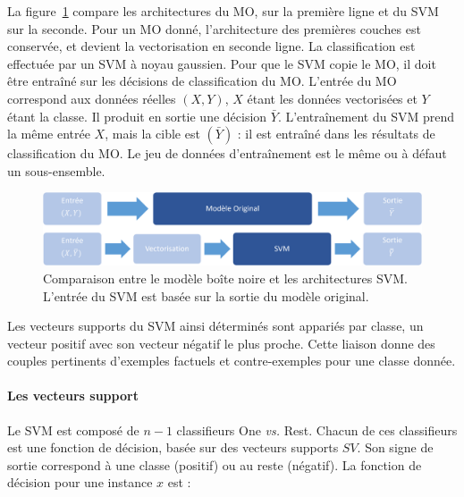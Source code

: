 
La figure~\ref{fig:model_architecture} compare les architectures du MO, sur la première ligne et du SVM sur la seconde. Pour un MO donné, l'architecture des premières couches est conservée, et devient la vectorisation en seconde ligne. La classification est effectuée par un SVM à noyau gaussien. Pour que le SVM copie le MO, il doit être entraîné sur les décisions de classification du MO. L'entrée du MO correspond aux données réelles $(X,Y)$, $X$ étant les données vectorisées et $Y$ étant la classe. Il produit en sortie une décision $\bar{Y}$. L'entraînement du SVM prend la même entrée $X$, mais la cible est $(\bar{Y})$ : il est entraîné dans les résultats de classification du MO. Le jeu de données d'entraînement est le même ou à défaut un sous-ensemble.

\begin{figure}[h!tpb]
\centering \includegraphics[width=\textwidth]{S4-Explicabilite_globale/figures/model_architecture.png}
\caption{Comparaison entre le modèle boîte noire et les architectures SVM. L'entrée du SVM est basée sur la sortie du modèle original.} \label{fig:model_architecture}
\end{figure}

Les vecteurs supports du SVM ainsi déterminés sont appariés par classe, un vecteur positif avec son vecteur négatif le plus proche. Cette liaison donne des couples pertinents d'exemples factuels et contre-exemples pour une classe donnée.

\paragraph{Les vecteurs support}
Le SVM est composé de $n-1$ classifieurs One \textit{vs.} Rest. Chacun de ces classifieurs est une fonction de décision, basée sur des vecteurs supports $SV$. Son signe de sortie correspond à une classe (positif) ou au reste (négatif). La fonction de décision pour une instance $x$ est :

